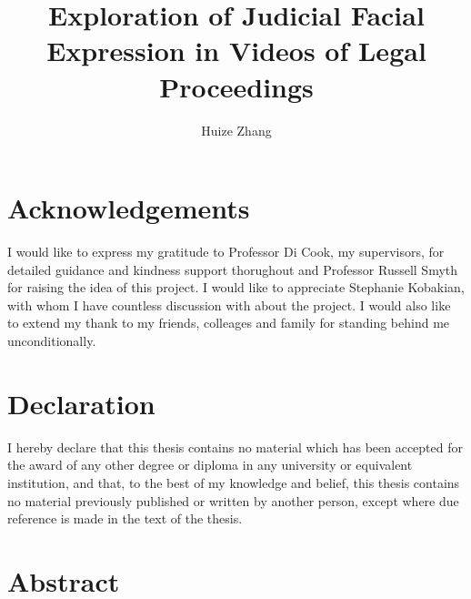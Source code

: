 \documentclass{monashthesis}
\author{Huize Zhang}
\title{Exploration of Judicial Facial Expression in Videos of Legal Proceedings}
\begin{document}

\titlepage

{\sf\tighttoc\doublespacing}

\clearpage{}\setcounter{page}{0}

\hypertarget{acknowledgements}{%
\chapter*{Acknowledgements}\label{acknowledgements}}

I would like to express my gratitude to Professor Di Cook, my supervisors, for detailed guidance and kindness support thorughout and Professor Russell Smyth for raising the idea of this project. I would like to appreciate Stephanie Kobakian, with whom I have countless discussion with about the project. I would also like to extend my thank to my friends, colleages and family for standing behind me unconditionally.

\let\cleardoublepage\clearpage

\hypertarget{declaration}{%
\chapter*{Declaration}\label{declaration}}

I hereby declare that this thesis contains no material which has been accepted for the award of any other degree or diploma in any university or equivalent institution, and that, to the best of my knowledge and belief, this thesis contains no material previously published or written by another person, except where due reference is made in the text of the thesis.

\vspace*{2cm}\par\authorname
\let\cleardoublepage\clearpage

\hypertarget{abstract}{%
\chapter*{Abstract}\label{abstract}}
\end{document}
